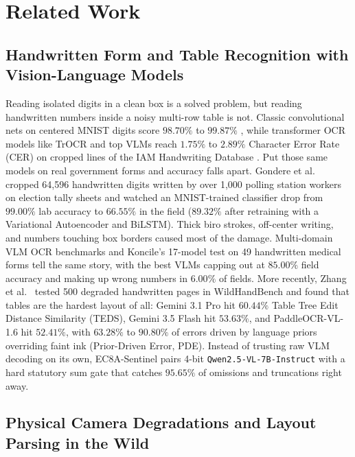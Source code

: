 \documentclass{article}
\begin{document}
\section{Related Work}

\subsection{Handwritten Form and Table Recognition with Vision-Language Models}

Reading isolated digits in a clean box is a solved problem, but reading handwritten numbers inside a noisy multi-row table is not. Classic convolutional nets on centered MNIST digits score $98.70\%$ to $99.87\%$ \cite{lecun1998gradient}, while transformer OCR models like TrOCR \cite{li2023trocr} and top VLMs reach $1.75\%$ to $2.89\%$ Character Error Rate (CER) on cropped lines of the IAM Handwriting Database \cite{koncile2025ocr}. Put those same models on real government forms and accuracy falls apart. Gondere et al.\ \cite{gondere2016election} cropped 64,596 handwritten digits written by over 1,000 polling station workers on election tally sheets and watched an MNIST-trained classifier drop from $99.00\%$ lab accuracy to $66.55\%$ in the field ($89.32\%$ after retraining with a Variational Autoencoder and BiLSTM). Thick biro strokes, off-center writing, and numbers touching box borders caused most of the damage. Multi-domain VLM OCR benchmarks \cite{alkhaled2025benchmarking,fu2025ocrbenchv2,poznanski2025olmocr} and Koncile's 17-model test on 49 handwritten medical forms \cite{koncile2025ocr} tell the same story, with the best VLMs capping out at $85.00\%$ field accuracy and making up wrong numbers in $6.00\%$ of fields. More recently, Zhang et al.\ \cite{zhang2026wildhandbench} tested 500 degraded handwritten pages in WildHandBench and found that tables are the hardest layout of all: Gemini 3.1 Pro hit $60.44\%$ Table Tree Edit Distance Similarity (TEDS), Gemini 3.5 Flash hit $53.63\%$, and PaddleOCR-VL-1.6 hit $52.41\%$, with $63.28\%$ to $90.80\%$ of errors driven by language priors overriding faint ink (Prior-Driven Error, PDE). Instead of trusting raw VLM decoding on its own, EC8A-Sentinel pairs 4-bit \texttt{Qwen2.5-VL-7B-Instruct} \cite{bai2025qwen25vl,dettmers2023qlora,dehghani2023navit} with a hard statutory sum gate that catches $95.65\%$ of omissions and truncations right away.

\subsection{Physical Camera Degradations and Layout Parsing in the Wild}
\end{document}
